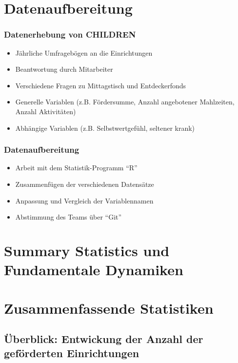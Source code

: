 \section{Datenaufbereitung}

\begin{frame}[fragile]
\frametitle{Datenerhebung von CHILDREN}

\begin{itemize}
 \item<1-> Jährliche Umfragebögen an die Einrichtungen
 \item<2-> Beantwortung durch Mitarbeiter
 \item<3-> Verschiedene Fragen zu Mittagstisch und Entdeckerfonds
 \item<4-> Generelle Variablen (z.B. Fördersumme, Anzahl angebotener Mahlzeiten, Anzahl Aktivitäten)
 \item<5-> Abhängige Variablen (z.B. Selbstwertgefühl, seltener krank)
  
\end{itemize}
\end{frame}

\begin{frame}[fragile]
\frametitle{Datenaufbereitung}

\begin{itemize}
 \item<1-> Arbeit mit dem Statistik-Programm “R”
 \item<2-> Zusammenfügen der verschiedenen Datensätze
 \item<3-> Anpassung und Vergleich der Variablennamen
 \item<4-> Abstimmung des Teams über “Git”
  
\end{itemize}

\end{frame}



\section{Summary Statistics und Fundamentale Dynamiken}


\section{Zusammenfassende Statistiken}

\subsection{Überblick: Entwickung der Anzahl der geförderten Einrichtungen}


